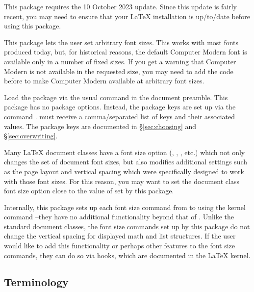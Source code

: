 \documentclass{beery}
\begin{document}
This package requires the 10 October 2023  update.
Since this update is fairly recent, you may need to ensure that your \LaTeX{} installation is up\-/to\-/date before using this package.

This package lets the user set arbitrary font sizes.
This works with most fonts produced today, but, for historical reasons, the default Computer Modern font is available only in a number of fixed sizes.
If you get a warning that Computer Modern is not available in the requested size, you may need to add the code  before  to make Computer Modern available at arbitrary font sizes.

\nopagebreak\newline
{}

Load the  package via the usual command in the document preamble.
This package has no package options.
Instead, the package keys are set up via the command .
 must receive a comma\-/separated list of keys and their associated values.
The package keys are documented in \S\ref{sec:choosing} and \S\ref{sec:overwriting}.

Many \LaTeX{} document classes have a font size option (\Key{10pt}, \Key{11pt}, \Key{12pt}, etc.\@) which not only changes the set of document font sizes, but also modifies additional settings such as the page layout and vertical spacing which were specifically designed to work with those font sizes.
For this reason, you may want to set the document class font size option close to the value of  set by this package.

Internally, this package sets up each font size command from  to  using the kernel command \---they have no additional functionality beyond that of .
Unlike the standard document classes, the font size commands set up by this package do not change the vertical spacing for displayed math and list structures.
If the user would like to add this functionality or perhaps other features to the font size commands, they can do so via hooks, which are documented in the \LaTeX{} kernel.

\subsection{Terminology}
\label{subsec:terminology}
\end{document}
